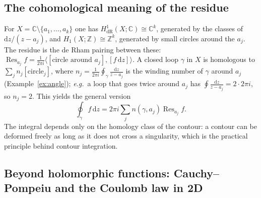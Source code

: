 \documentclass[11pt,a4paper]{article}
\numberwithin{equation}{section}
\theoremstyle{definition}
\theoremstyle{plain}
\newcommand{\C}{\mathbb{C}}
\newcommand{\Z}{\mathbb{Z}}
\newcommand{\dd}{\mathrm{d}}
\newcommand{\Res}{\operatorname{Res}}
\newcommand{\eg}{\emph{e.g.}\ }
\begin{document}
\subsection{The cohomological meaning of the residue}\label{sec:rescohom}

For $X=\C\setminus\{a_1,\dots,a_k\}$ one has $H^1_{\mathrm{dR}}(X;\C)\cong\C^k$, generated by the classes of $\dd z/(z-a_j)$, and $H_1(X;\Z)\cong\Z^k$, generated by small circles around the $a_j$. The residue is the de Rham pairing between these:
$\Res_{a_j}f=\frac1{2\pi i}\bigl\langle[\text{circle around }a_j],[f\,\dd z]\bigr\rangle$.
A closed loop $\gamma$ in $X$ is homologous to $\sum_jn_j[\text{circle}_j]$, where $n_j=\frac1{2\pi i}\oint_\gamma\frac{\dd z}{z-a_j}$ is the winding number of $\gamma$ around $a_j$ (Example~\ref{ex:angle}); \eg a loop that goes twice around $a_j$ has $\oint\frac{\dd z}{z-a_j}=2\cdot2\pi i$, so $n_j=2$. This yields the general version
\begin{equation}\label{eq:winding}
\oint_\gamma f\,\dd z=2\pi i\sum_jn(\gamma,a_j)\Res_{a_j}f .
\end{equation}
The integral depends only on the homology class of the contour: a contour can be deformed freely as long as it does not cross a singularity, which is the practical principle behind contour integration.

\subsection{Beyond holomorphic functions: Cauchy--Pompeiu and the Coulomb law in 2D}\label{sec:pompeiu}
\end{document}
